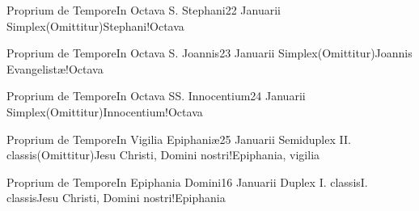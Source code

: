 \documentclass[liber-responsorialis_hiemalis.tex]{subfiles}
\begin{document}
	{Proprium de Tempore}{In Octava S. Stephani}{2}{2 Januarii}
	{Simplex}{(Omittitur)}{Stephani!Octava}
	{}
	{}

	{Proprium de Tempore}{In Octava S. Joannis}{2}{3 Januarii}
	{Simplex}{(Omittitur)}{Joannis Evangelistæ!Octava}
	{}
	{}

	{Proprium de Tempore}{In Octava SS. Innocentium}{2}{4 Januarii}
	{Simplex}{(Omittitur)}{Innocentium!Octava}
	{}
	{}

	{Proprium de Tempore}{In Vigilia Epiphaniæ}{2}{5 Januarii}
	{Semiduplex II. classis}{(Omittitur)}{Jesu Christi, Domini nostri!Epiphania, vigilia}
	{}
	{}

	{Proprium de Tempore}{In Epiphania Domini}{1}{6 Januarii}
	{Duplex I. classis}{I. classis}{Jesu Christi, Domini nostri!Epiphania}
	{}
	{}
\end{document}
